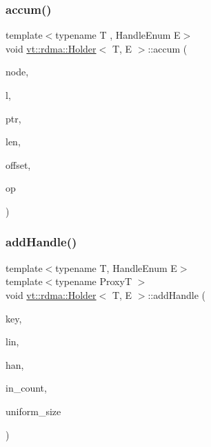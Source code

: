 \subsubsection{\texorpdfstring{accum()}{accum()}}
{\footnotesize\ttfamily template$<$typename T , Handle\+Enum E$>$ \\
void \hyperlink{structvt_1_1rdma_1_1_holder}{vt\+::rdma\+::\+Holder}$<$ T, E $>$\+::accum (\begin{DoxyParamCaption}\item[{\hyperlink{namespacevt_a866da9d0efc19c0a1ce79e9e492f47e2}{vt\+::\+Node\+Type}}]{node,  }\item[{\hyperlink{namespacevt_1_1rdma_ac5c20b41a653e520b6305d4d454ecb70}{Lock}}]{l,  }\item[{T $\ast$}]{ptr,  }\item[{std\+::size\+\_\+t}]{len,  }\item[{int}]{offset,  }\item[{M\+P\+I\+\_\+\+Op}]{op }\end{DoxyParamCaption})}

\mbox{\label{structvt_1_1rdma_1_1_holder_af2c376f5523ded1fca4df3a809a01395}} 
\subsubsection{\texorpdfstring{add\+Handle()}{addHandle()}\hspace{0.1cm}{\footnotesize\ttfamily [1/2]}}
{\footnotesize\ttfamily template$<$typename T, Handle\+Enum E$>$ \\
template$<$typename ProxyT $>$ \\
void \hyperlink{structvt_1_1rdma_1_1_holder}{vt\+::rdma\+::\+Holder}$<$ T, E $>$\+::add\+Handle (\begin{DoxyParamCaption}\item[{\hyperlink{structvt_1_1rdma_1_1_handle_key}{Handle\+Key}}]{key,  }\item[{\mbox{[}\mbox{[}maybe\+\_\+unused\mbox{]} \mbox{]} \hyperlink{namespacevt_1_1rdma_a38e310504e675aa1bcaf7811019b0df2}{Elem\+Type}}]{lin,  }\item[{\hyperlink{structvt_1_1rdma_1_1_handle}{Handle}$<$ T, E $>$}]{han,  }\item[{std\+::size\+\_\+t}]{in\+\_\+count,  }\item[{bool}]{uniform\+\_\+size }\end{DoxyParamCaption})}

